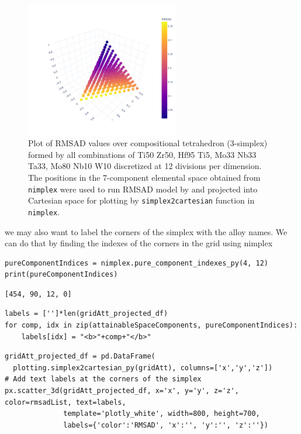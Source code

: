 \begin{figure}[H]
    \centering
    \includegraphics[width=0.6\textwidth]{nimplexTutorial1/01.QuickStart_47_0.pdf}
    \caption{Plot of RMSAD values over compositional tetrahedron (3-simplex) formed by all combinations of Ti50 Zr50, Hf95 Ti5, Mo33 Nb33 Ta33, Mo80 Nb10 W10 discretized at 12 divisions per dimension. The positions in the 7-component elemental space obtained from \texttt{nimplex} \cite{Krajewski2024Nimplex} were used to run RMSAD model by \cite{Tandoc2023MiningAlloys} and projected into Cartesian space for plotting by \texttt{simplex2cartesian} function in \texttt{nimplex}.}
    \label{nimplextutorial1:fig:quaternaryattainablecolored}
\end{figure}


we may also want to label the corners of the simplex with the alloy
names. We can do that by finding the indexes of the corners in the grid
using nimplex

\begin{verbatim}
pureComponentIndices = nimplex.pure_component_indexes_py(4, 12)
print(pureComponentIndices)
\end{verbatim}

\begin{verbatim}
[454, 90, 12, 0]
\end{verbatim}

\begin{verbatim}
labels = ['']*len(gridAtt_projected_df)
for comp, idx in zip(attainableSpaceComponents, pureComponentIndices):
    labels[idx] = "<b>"+comp+"</b>"
\end{verbatim}

\begin{verbatim}
gridAtt_projected_df = pd.DataFrame(
  plotting.simplex2cartesian_py(gridAtt), columns=['x','y','z'])
# Add text labels at the corners of the simplex
px.scatter_3d(gridAtt_projected_df, x='x', y='y', z='z', color=rmsadList, text=labels,
              template='plotly_white', width=800, height=700, 
              labels={'color':'RMSAD', 'x':'', 'y':'', 'z':''})
\end{verbatim}

